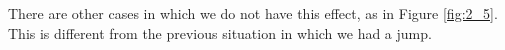 \documentclass[../main/main.tex]{subfiles}
\begin{document}
There are other cases in which we do not have this effect, as in Figure \ref{fig:2_5}. This is different from the previous situation in which we had a jump.
\begin{figure}[h!]
\begin{minipage}[c]{0.3\linewidth}
\end{minipage}
\begin{minipage}[]{0.3\linewidth}
\centering
{}
\end{minipage}

\end{figure}
\end{document}
